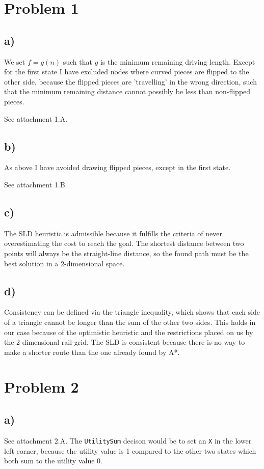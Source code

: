 \documentclass[12pt,a4paper]{article}
\author{Jens Egholm Pedersen}
\begin{document}
\section*{Problem 1}
\subsection*{a)}
We set $f = g(n)$ such that $g$ is the minimum remaining driving length.
Except for the first state I have excluded nodes where curved pieces
are flipped to the other side, because the flipped pieces are 'travelling'
in the wrong direction, such that the minimum remaining distance cannot possibly
be less than non-flipped pieces.

See attachment 1.A.

\subsection*{b)}
As above I have avoided drawing flipped pieces, except in the first state.

See attachment 1.B.

\subsection*{c)}
The SLD heuristic is admissible because it fulfills the criteria of never
overestimating the cost to reach the goal. The shortest distance between
two points will always be the straight-line distance, so the found path must
be the best solution in a 2-dimensional space.

\subsection*{d)}
Consistency can be defined via the triangle inequality, which shows that
each side of a triangle cannot be longer than the sum of the other two sides.
This holds in our case because of the optimistic heuristic and the restrictions
placed on us by the 2-dimensional rail-grid.
The SLD is consistent because there is no way to make a shorter route than the
one already found by A*.

\pagebreak
\section*{Problem 2}
\subsection*{a)}
See attachment 2.A. The \texttt{UtilitySum} decison would be to set an
\texttt{X} in the lower left corner, because the utility value is 1
compared to the other two states which both sum to the utility value 0.
\end{document}
